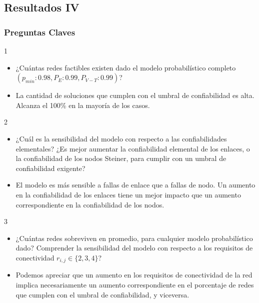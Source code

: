 \subsection{Resultados IV}
\begin{frame} \frametitle{Preguntas Claves}
\begin{tiny}
\begin{block} {1}
 	 \begin{itemize}
 	 	\item ¿Cuántas redes factibles existen dado el modelo probabilístico completo $(p_{min}:0.98,P_E:0.99,P_{V-T}:0.99)$?
 	 	\item La cantidad de soluciones que cumplen con el umbral de confiabilidad es alta. Alcanza el 100\% en la mayoría de los casos.
 	 \end{itemize}  
 \end{block} 	   
 \begin{block} {2}
 	 \begin{itemize}
 	 	\item ¿Cuál es la sensibilidad del modelo con respecto a las confiabilidades elementales? ¿Es mejor aumentar la confiabilidad elemental de los enlaces, o la confiabilidad de los nodos Steiner, para cumplir con un umbral de confiabilidad exigente?
 	 	\item El modelo es más sensible a fallas de enlace que a fallas de nodo. Un aumento en la confiabilidad de los enlaces tiene un mejor impacto que un aumento correspondiente en la confiabilidad de los nodos.
 	 \end{itemize}  
 \end{block} 	
  \begin{block} {3}
 	 \begin{itemize}
 	 	\item ¿Cuántas redes sobreviven en promedio, para cualquier modelo probabilístico dado? Comprender la sensibilidad del modelo con respecto a los requisitos de conectividad $r_{i,j} \in \{2,3,4\}$?
 	 	\item Podemos apreciar que un aumento en los requisitos de conectividad de la red implica necesariamente un aumento correspondiente en el porcentaje de redes que cumplen con el umbral de confiabilidad, y viceversa.
 	 \end{itemize}  
 \end{block} 	
 \end{tiny}
\end{frame}

